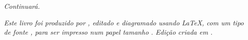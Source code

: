 \cleardoublepage

\null
\vfill

\begin{flushright}
{\normalsize \it Continuará.
\vspace*{4pt}}
\end{flushright}

\newpage

\null
\vfill
\thispagestyle{empty}


{\normalsize \it Este livro foi produzido por \myauthor, editado e diagramado usando \LaTeX,
com um tipo de fonte \showfont,
para ser impresso num papel tamanho \imprimirpapersize. Edição criada em \imprimirdata.
\vspace*{4pt}}






